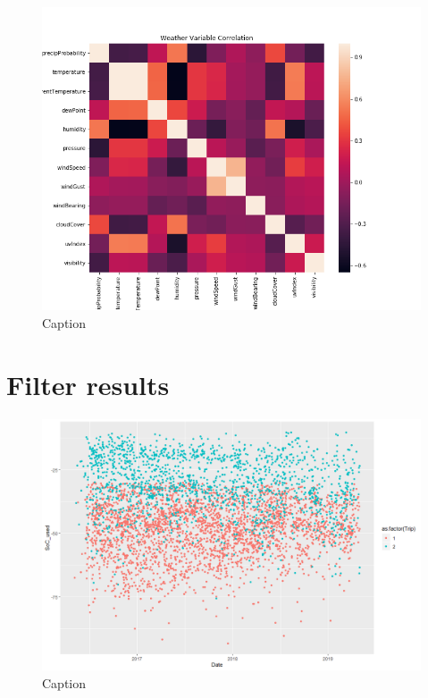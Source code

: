 \documentclass{article}
\begin{document}
\begin{figure}[ht]
    \centering
    \includegraphics[width = \textwidth]{weather_correlation.png}
    \caption{Caption}
    \label{fig:weather_cor}
\end{figure}

\section{Filter results}

\begin{figure}
    \centering
    \includegraphics[width = \textwidth]{SoC_used_per_trip_by_filter.png}
    \caption{Caption}
    \label{fig:soc_per_trip}
\end{figure}
\end{document}
